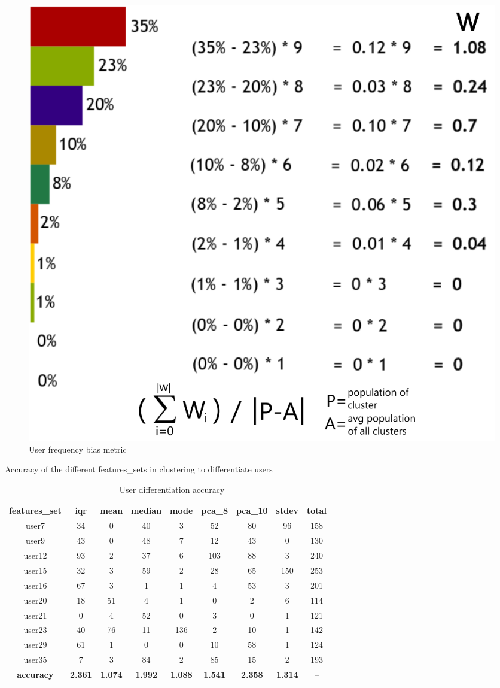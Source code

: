 \begin{figure}[h!]
	\centering
	\includegraphics[width=.8\columnwidth]{figures/user_freq_distribution}

	\caption{User frequency bias metric}
	\label{fig:user_freq_bias_metric}
\end{figure}

\begin{table}[h!]
	\centering
	\caption{User differentiation accuracy}
	{\small Accuracy of the different features{\_}sets in clustering to differentiate users}
	\bigskip
	\label{tab:user-differentiation-accuracy}
	\begin{tabular}{ |c|c|c|c|c|c|c|c|c|c| }
		\hline
		\textbf{features{\_}set} & \textbf{iqr} & \textbf{mean} & \textbf{median} & \textbf{mode} & \textbf{pca{\_}8} & \textbf{pca{\_}10} & \textbf{stdev} & total \\
		\hline
		user7 & 34 & 0 & 40 & 3 & 52 & 80 & 96 & 158 \\
		user9 & 43 & 0 & 48 & 7 & 12 & 43 & 0 & 130 \\
		user12 & 93 & 2 & 37 & 6 & 103 & 88 & 3 & 240 \\
		user15 & 32 & 3 & 59 & 2 & 28 & 65 & 150 & 253\\
		user16 & 67 & 3 & 1 & 1 & 4 & 53 & 3 & 201\\
		user20 & 18 & 51 & 4 & 1 & 0 & 2 & 6 & 114 \\
		user21 & 0 & 4 & 52 & 0 & 3 & 0 & 1 & 121 \\
		user23 & 40 & 76 & 11 & 136 & 2 & 10 & 1 & 142 \\
		user29 & 61 & 1 & 0 & 0 & 10 & 58 & 1 & 124 \\
		user35 & 7 & 3 & 84 & 2 & 85 & 15 & 2 & 193 \\
		\hline
		\textbf{accuracy} & \textbf{2.361} & \textbf{1.074} & \textbf{1.992} & \textbf{1.088} & \textbf{1.541} & \textbf{2.358} & \textbf{1.314} & -- \\
		\hline
	\end{tabular}
\end{table}

